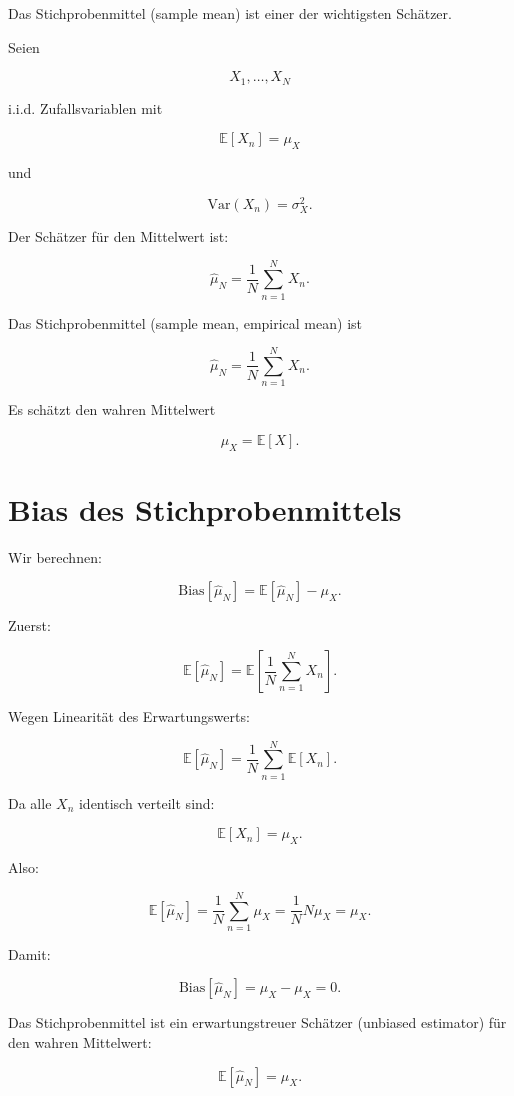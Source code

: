 Das Stichprobenmittel (sample mean) ist einer der wichtigsten Schätzer.

Seien

\[
    X_1,\dots,X_N
\]

i.i.d. Zufallsvariablen mit

\[
    \mathbb{E}[X_n] = \mu_X
\]

und

\[
    \mathrm{Var}(X_n) = \sigma_X^2.
\]

Der Schätzer für den Mittelwert ist:

\[
    \hat{\mu}_N
    =
    \frac{1}{N}
    \sum_{n=1}^{N}
    X_n.
\]

\begin{definitionbox}
Das Stichprobenmittel (sample mean, empirical mean) ist

\[
    \hat{\mu}_N
    =
    \frac{1}{N}
    \sum_{n=1}^{N}
    X_n.
\]

Es schätzt den wahren Mittelwert

\[
    \mu_X
    =
    \mathbb{E}[X].
\]
\end{definitionbox}

\section{Bias des Stichprobenmittels}

Wir berechnen:

\[
    \mathrm{Bias}[\hat{\mu}_N]
    =
    \mathbb{E}[\hat{\mu}_N]
    -
    \mu_X.
\]

Zuerst:

\[
    \mathbb{E}[\hat{\mu}_N]
    =
    \mathbb{E}\left[
        \frac{1}{N}
        \sum_{n=1}^{N}
        X_n
    \right].
\]

Wegen Linearität des Erwartungswerts:

\[
    \mathbb{E}[\hat{\mu}_N]
    =
    \frac{1}{N}
    \sum_{n=1}^{N}
    \mathbb{E}[X_n].
\]

Da alle \(X_n\) identisch verteilt sind:

\[
    \mathbb{E}[X_n] = \mu_X.
\]

Also:

\[
    \mathbb{E}[\hat{\mu}_N]
    =
    \frac{1}{N}
    \sum_{n=1}^{N}
    \mu_X
    =
    \frac{1}{N}
    N\mu_X
    =
    \mu_X.
\]

Damit:

\[
    \mathrm{Bias}[\hat{\mu}_N]
    =
    \mu_X-\mu_X
    =
    0.
\]

\begin{conceptbox}
Das Stichprobenmittel ist ein erwartungstreuer Schätzer (unbiased estimator) für den wahren Mittelwert:

\[
    \mathbb{E}[\hat{\mu}_N]
    =
    \mu_X.
\]
\end{conceptbox}

